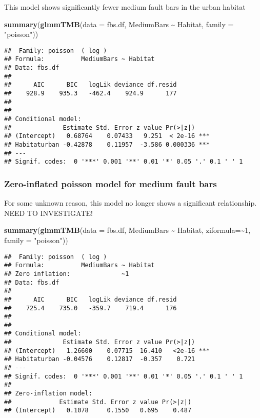 \documentclass[
]{article}
\newenvironment{Shaded}{\begin{snugshade}}{\end{snugshade}}
\newcommand{\AttributeTok}[1]{\textcolor[rgb]{0.13,0.29,0.53}{#1}}
\newcommand{\DecValTok}[1]{\textcolor[rgb]{0.00,0.00,0.81}{#1}}
\newcommand{\FunctionTok}[1]{\textcolor[rgb]{0.13,0.29,0.53}{\textbf{#1}}}
\newcommand{\NormalTok}[1]{#1}
\newcommand{\SpecialCharTok}[1]{\textcolor[rgb]{0.81,0.36,0.00}{\textbf{#1}}}
\newcommand{\StringTok}[1]{\textcolor[rgb]{0.31,0.60,0.02}{#1}}
\begin{document}
This model shows significantly fewer medium fault bars in the urban
habitat

\begin{Shaded}
\begin{Highlighting}[]
\FunctionTok{summary}\NormalTok{(}\FunctionTok{glmmTMB}\NormalTok{(}\AttributeTok{data =}\NormalTok{ fbs.df, MediumBars }\SpecialCharTok{\textasciitilde{}}\NormalTok{ Habitat, }\AttributeTok{family =} \StringTok{"poisson"}\NormalTok{))}
\end{Highlighting}
\end{Shaded}

\begin{verbatim}
##  Family: poisson  ( log )
## Formula:          MediumBars ~ Habitat
## Data: fbs.df
## 
##      AIC      BIC   logLik deviance df.resid 
##    928.9    935.3   -462.4    924.9      177 
## 
## 
## Conditional model:
##              Estimate Std. Error z value Pr(>|z|)    
## (Intercept)   0.68764    0.07433   9.251  < 2e-16 ***
## Habitaturban -0.42878    0.11957  -3.586 0.000336 ***
## ---
## Signif. codes:  0 '***' 0.001 '**' 0.01 '*' 0.05 '.' 0.1 ' ' 1
\end{verbatim}

\subsubsection{Zero-inflated poisson model for medium fault
bars}\label{zero-inflated-poisson-model-for-medium-fault-bars}

For some unknown reason, this model no longer shows a significant
relationship. NEED TO INVESTIGATE!

\begin{Shaded}
\begin{Highlighting}[]
\FunctionTok{summary}\NormalTok{(}\FunctionTok{glmmTMB}\NormalTok{(}\AttributeTok{data =}\NormalTok{ fbs.df, MediumBars }\SpecialCharTok{\textasciitilde{}}\NormalTok{ Habitat, }\AttributeTok{ziformula=}\SpecialCharTok{\textasciitilde{}}\DecValTok{1}\NormalTok{, }\AttributeTok{family =} \StringTok{"poisson"}\NormalTok{))}
\end{Highlighting}
\end{Shaded}

\begin{verbatim}
##  Family: poisson  ( log )
## Formula:          MediumBars ~ Habitat
## Zero inflation:              ~1
## Data: fbs.df
## 
##      AIC      BIC   logLik deviance df.resid 
##    725.4    735.0   -359.7    719.4      176 
## 
## 
## Conditional model:
##              Estimate Std. Error z value Pr(>|z|)    
## (Intercept)   1.26600    0.07715  16.410   <2e-16 ***
## Habitaturban -0.04576    0.12817  -0.357    0.721    
## ---
## Signif. codes:  0 '***' 0.001 '**' 0.01 '*' 0.05 '.' 0.1 ' ' 1
## 
## Zero-inflation model:
##             Estimate Std. Error z value Pr(>|z|)
## (Intercept)   0.1078     0.1550   0.695    0.487
\end{verbatim}
\end{document}
